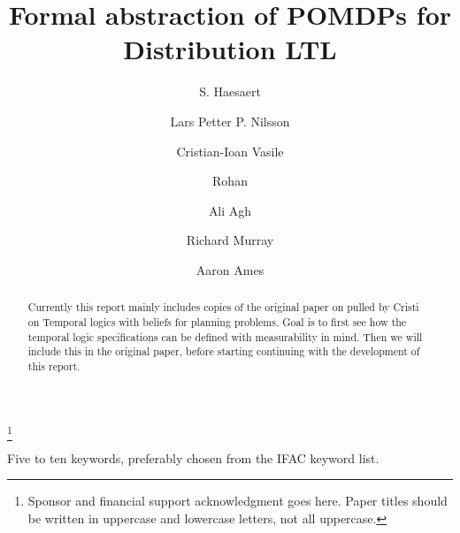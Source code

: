 \documentclass{ifacconf}
\begin{document}
\begin{frontmatter}

\title{\huge Formal abstraction of POMDPs for Distribution LTL}
\thanks[footnoteinfo]{Sponsor and financial support acknowledgment
goes here. Paper titles should be written in uppercase and lowercase
letters, not all uppercase.}

\author[cal]{S. Haesaert} 
\author[cal]{Lars Petter P.  Nilsson} 
\author[mit]{ Cristian-Ioan Vasile}
\author[jpl]{Rohan}
\author[jpl]{ Ali Agh}
\author[cal]{Richard Murray}
\author[cal]{Aaron Ames}

\address[cal]{California Institute of Technology, 
   Pasadena, CA 91125 USA (e-mail: \{haesaert,pettni,ames,murray\}@caltech ).}
\address[mit]{Massachusetts Institute of Technology, 
   Cambridge, MA 02139 USA (e-mail:  cvasile@mit.edu)}
\address[jpl]{Jet Propulsion Laboratory, 
   Pasadena, CA 91109 USA (e-mail: rohan.a.thakker@jpl.nasa.gov)} 
\maketitle
\begin{abstract}
Currently this report mainly includes copies of the  original paper on pulled by Cristi on Temporal logics with beliefs for planning problems.  Goal is to first see how the temporal logic specifications can be defined with measurability in mind. Then we will include this in the original paper, before starting continuing with the development of this report. 
\end{abstract}
\begin{keyword}
Five to ten keywords, preferably chosen from the IFAC keyword list.
\end{keyword}

\end{frontmatter}
 
\end{document}
